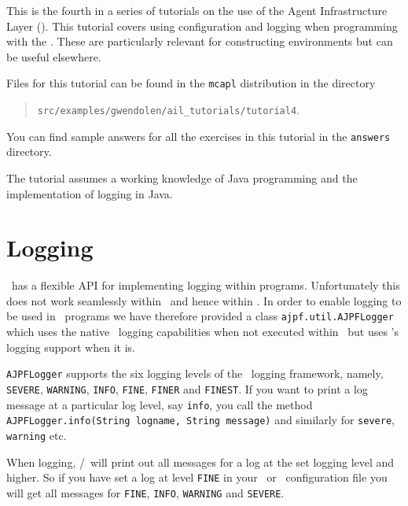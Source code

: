 This is the fourth in a series of tutorials on the use of the Agent Infrastructure Layer (\ail).  This tutorial covers using configuration and logging when programming with the \ail.  These are particularly relevant for constructing environments but can be useful elsewhere.

Files for this tutorial can be found in the \texttt{mcapl} distribution in the directory
\begin{quote}
  \texttt{src/examples/gwendolen/ail\_tutorials/tutorial4}.
\end{quote}

You can find sample answers for all the exercises in this tutorial in the \texttt{answers} directory.

The tutorial assumes a working knowledge of Java programming and the implementation of logging in Java.

\section{Logging}
\java\ has a flexible API for implementing logging within programs.  Unfortunately this does not work seamlessly within \jpf\ and hence within \ajpf{}.  In order to enable logging to be used in \ail\ programs we have therefore provided a class \texttt{ajpf.util.AJPFLogger} which uses the native \java\ logging capabilities when not executed within \ajpf\ but uses \jpf's logging support when it is.

\begin{sloppypar}
  \texttt{AJPFLogger} supports the six logging levels of the \java\ logging framework, namely, \texttt{SEVERE}, \texttt{WARNING}, \texttt{INFO}, \texttt{FINE}, \texttt{FINER} and \texttt{FINEST}.  If you want to print a log message at a particular log level, say \texttt{info}, you call the method \texttt{AJPFLogger.info(String logname, String message)} and similarly for \texttt{severe}, \texttt{warning} etc.
\end{sloppypar}

When logging, \java/\jpf\ will print out all messages for a log at the set logging level and higher.  So if you have set a log at level \texttt{FINE} in your \ail\ or \jpf\ configuration file you will get all messages for \texttt{FINE}, \texttt{INFO}, \texttt{WARNING} and \texttt{SEVERE}.

